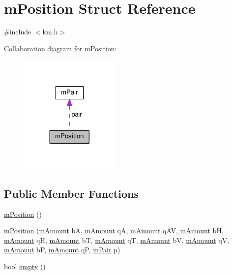\hypertarget{struct_k_1_1m_position}{}\section{m\+Position Struct Reference}
\label{struct_k_1_1m_position}


{\ttfamily \#include $<$km.\+h$>$}



Collaboration diagram for m\+Position\+:
\nopagebreak
\begin{figure}[H]
\begin{center}
\leavevmode
\includegraphics[width=140pt]{struct_k_1_1m_position__coll__graph}
\end{center}
\end{figure}
\subsection*{Public Member Functions}
\begin{DoxyCompactItemize}
\item 
\hyperlink{struct_k_1_1m_position_a31f8f5c2c64206935eeebf00f7017e62}{m\+Position} ()
\item 
\hyperlink{struct_k_1_1m_position_ad6429b29c6410b15083e4b90e5130231}{m\+Position} (\hyperlink{km_8h_ad4d00888c55a47a8a40ed8020d176086}{m\+Amount} bA, \hyperlink{km_8h_ad4d00888c55a47a8a40ed8020d176086}{m\+Amount} qA, \hyperlink{km_8h_ad4d00888c55a47a8a40ed8020d176086}{m\+Amount} q\+AV, \hyperlink{km_8h_ad4d00888c55a47a8a40ed8020d176086}{m\+Amount} bH, \hyperlink{km_8h_ad4d00888c55a47a8a40ed8020d176086}{m\+Amount} qH, \hyperlink{km_8h_ad4d00888c55a47a8a40ed8020d176086}{m\+Amount} bT, \hyperlink{km_8h_ad4d00888c55a47a8a40ed8020d176086}{m\+Amount} qT, \hyperlink{km_8h_ad4d00888c55a47a8a40ed8020d176086}{m\+Amount} bV, \hyperlink{km_8h_ad4d00888c55a47a8a40ed8020d176086}{m\+Amount} qV, \hyperlink{km_8h_ad4d00888c55a47a8a40ed8020d176086}{m\+Amount} bP, \hyperlink{km_8h_ad4d00888c55a47a8a40ed8020d176086}{m\+Amount} qP, \hyperlink{struct_k_1_1m_pair}{m\+Pair} p)
\item 
bool \hyperlink{struct_k_1_1m_position_a3f37b042a1e7cd4bd38fc564de81f0da}{empty} ()
\end{DoxyCompactItemize}

